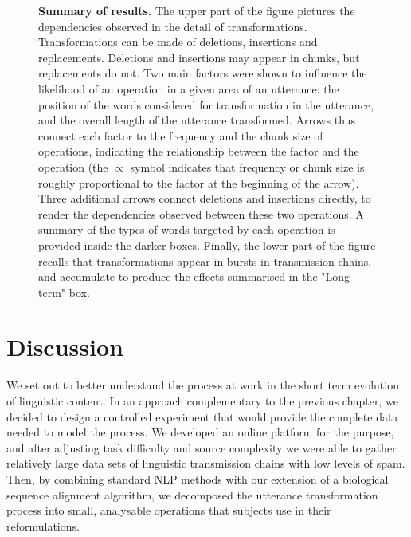 \documentclass[a4paper,fleqn]{cas-dc}
\begin{document}
\begin{figure}
  \caption[Summary of results]{
  \textbf{Summary of results.}
  The upper part of the figure pictures the dependencies observed in the detail of transformations.
  Transformations can be made of deletions, insertions and replacements.
  Deletions and insertions may appear in chunks, but replacements do not.
  Two main factors were shown to influence the likelihood of an operation in a given area of an utterance:
  the position of the words considered for transformation in the utterance, and the overall length of the utterance transformed.
  Arrows thus connect each factor to the frequency and the chunk size of operations, indicating the relationship between the factor and the operation (the $\propto$ symbol indicates that frequency or chunk size is roughly proportional to the factor at the beginning of the arrow).
  Three additional arrows connect deletions and insertions directly, to render the dependencies observed between these two operations.
  A summary of the types of words targeted by each operation is provided inside the darker boxes.
  Finally, the lower part of the figure recalls that transformations appear in bursts in transmission chains, and accumulate to produce the effects summarised in the "Long term" box.
  }
  \label{fig:gistr-summary}
\end{figure}




\section{Discussion}\label{sec:gistr-discussion}

We set out to better understand the process at work in the short term
evolution of linguistic content. In an approach complementary to the
previous chapter, we decided to design a controlled experiment that
would provide the complete data needed to model the process. We
developed an online platform for the purpose, and after adjusting task
difficulty and source complexity we were able to gather relatively large
data sets of linguistic transmission chains with low levels of spam.
Then, by combining standard NLP methods with our extension of a
biological sequence alignment algorithm, we decomposed the utterance
transformation process into small, analysable operations that subjects
use in their reformulations.
\end{document}

